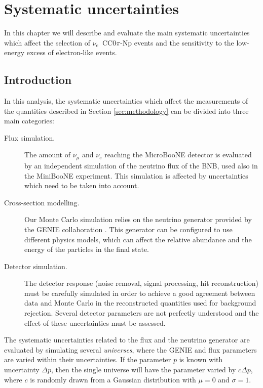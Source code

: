 \chapter{Systematic uncertainties}\label{sec:systematics}
\minitoc

In this chapter we will describe and evaluate the main systematic uncertainties which affect the selection of $\nu_e$~CC0$\pi$-Np events and the sensitivity to the low-energy excess of electron-like events.

\section{Introduction}
In this analysis, the systematic uncertainties which affect the measurements of the quantities described in Section \ref{sec:methodology} can be divided into three main categories: 
\begin{description}
\item[Flux simulation.] The amount of $\nu_{\mu}$ and $\nu_{e}$ reaching the MicroBooNE detector is evaluated by an independent simulation of the neutrino flux of the BNB, used also in the MiniBooNE experiment. This simulation is affected by uncertainties which need to be taken into account.

\item[Cross-section modelling.] Our Monte Carlo simulation relies on the neutrino generator provided by the GENIE collaboration \cite{Andreopoulos:2009rq}. This generator can be configured to use different physics models, which can affect the relative abundance and the energy of the particles in the final state.

\item[Detector simulation.] The detector response (noise removal, signal processing, hit reconstruction) must be carefully simulated in order to achieve a good agreement between data and Monte Carlo in the reconstructed quantities used for background rejection. Several detector parameters are not perfectly understood and the effect of these uncertainties must be assessed. 
\end{description}

The systematic uncertainties related to the flux and the neutrino generator are evaluated by simulating several \emph{universes}, where the GENIE and flux parameters are varied within their uncertainties. If the parameter $p$ is known with uncertainty $\Delta p$, then the single universe will have the parameter varied by $c\Delta p$, where $c$ is randomly drawn from a Gaussian distribution with $\mu=0$ and $\sigma=1$.

